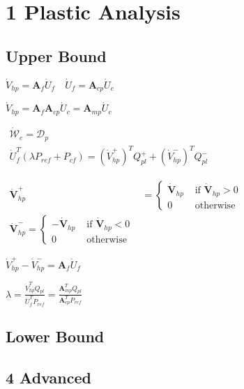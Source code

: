 \hypertarget{plastic-analysis}{%
\section{1 Plastic Analysis}\label{plastic-analysis}}

\hypertarget{upper-bound}{%
\subsection{Upper Bound}\label{upper-bound}}

\(\dot{V}_{h p}=\mathbf{A}_{f} \dot{U}_{f} \quad \dot{U}_{f}=\mathbf{A}_{c p} \dot{U}_{c}\)

\(\dot{V}_{h p}=\mathbf{A}_{f} \mathbf{A}_{c p} \dot{U}_{c}=\mathbf{A}_{m p} \dot{U}_{c}\)

\(\begin{array}{c}{\dot{\mathcal{W}}_{e}=\mathcal{D}_{p}} \\ {\dot{U}_{f}^{T}\left(\lambda P_{r e f}+P_{c f}\right)=\left(\dot{V}_{h p}^{+}\right)^{T} Q_{p l}^{+}+\left(\dot{V}_{h p}^{-}\right)^{T} Q_{p l}^{-}}\end{array}\)

\(\begin{aligned} \dot{\boldsymbol{V}}_{h p}^{+} &=\left\{\begin{array}{ll}{\dot{\boldsymbol{V}}_{h p}} & {\text { if } \dot{\boldsymbol{V}}_{h p}>0} \\ {0} & {\text { otherwise }}\end{array}\right.\\ \dot{\boldsymbol{V}}_{h p}^{-}=\left\{\begin{array}{cc}{-\dot{\boldsymbol{V}}_{h p}} & {\text { if } \dot{\boldsymbol{V}}_{h p}<0} \\ {0} & {\text { otherwise }}\end{array}\right.\end{aligned}\)

\(\dot{V}_{h p}^{+}-\dot{V}_{h p}^{-}=\mathbf{A}_{f} \dot{U}_{f}\)

\(\lambda=\frac{\dot{V}_{h p}^{T} Q_{p l}}{\dot{U}_{f}^{T} P_{r e f}}=\frac{\mathbf{A}_{m p}^{T} Q_{p l}}{\mathbf{A}_{c p}^{T} P_{r e f}}\)

\hypertarget{lower-bound}{%
\subsection{Lower Bound}\label{lower-bound}}

\hypertarget{advanced}{%
\subsection{4 Advanced}\label{advanced}}

